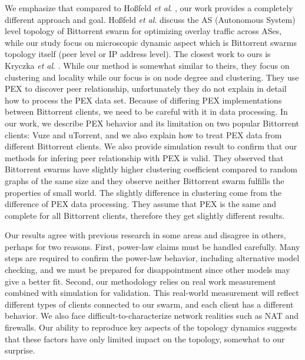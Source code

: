 We emphasize that compared to Ho\ss{}feld \textit{et al}. \cite{TR464}, our work provides a completely different approach and goal.
Ho\ss{}feld \textit{et al}. \cite{TR464} discuss the AS (Autonomous System) level topology of Bittorrent swarm for optimizing overlay traffic across ASes, while our study focus on microscopic dynamic aspect which is Bittorrent swarms topology itself (peer level or IP address level). 
The closest work to ours is Kryczka \textit{et al}. \cite{Kryczka2011}.
While our method is somewhat similar to theirs, they focus on clustering and locality while our focus is on node degree and clustering.
They use PEX to discover peer relationship, unfortunately they do not explain in detail how to process the PEX data set.
Because of differing PEX implementations between Bittorrent clients, we need to be careful with it in data processing.  
In our work, we describe PEX behavior and its limitation on two popular Bittorrent clients: Vuze and uTorrent, and we also explain how to treat PEX data from different Bittorrent clients. 
We also provide simulation result to confirm that our methods for infering peer relationship with PEX is valid.  
They observed that Bittorrent swarms have slightly higher clustering coefficient compared to random graphs of the same size and they observe neither Bittorrent swarm fulfills the properties of small world.
The slightly difference in clustering come from the difference of PEX data processing. 
They assume that PEX is the same and complete for all Bittorrent clients, therefore they get slightly different results. 

Our results agree with previous research \cite{dale2008evolution} in some areas and disagree in others, perhaps for two reasons.
First, power-law claims must be handled carefully. 
Many steps are required to confirm the power-law behavior, including alternative model checking, and we must be prepared for disappointment since other models may give a better fit. 
Second, our methodology relies on real work measurement combined with simulation for validation. 
This real-world measurement will reflect different types of clients connected to our swarm, and each client has a different behavior. 
We also face difficult-to-characterize network realities such as NAT and firewalls. 
Our ability to reproduce key aspects of the topology dynamics suggests that these factors have only limited impact on the topology, somewhat to our surprise.

